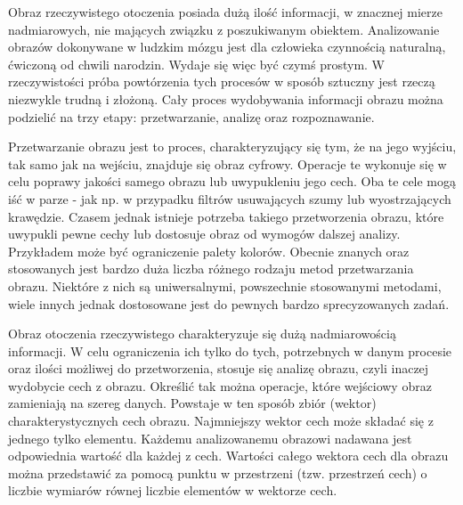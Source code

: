 
Obraz rzeczywistego otoczenia posiada dużą ilość informacji, w znacznej mierze nadmiarowych, nie mających związku z poszukiwanym obiektem. Analizowanie obrazów dokonywane w ludzkim mózgu jest dla człowieka czynnością naturalną, ćwiczoną od chwili narodzin. Wydaje się więc być czymś prostym. W rzeczywistości próba powtórzenia tych procesów w sposób sztuczny jest rzeczą niezwykle trudną i złożoną. Cały proces wydobywania informacji obrazu można podzielić na trzy etapy: przetwarzanie, analizę oraz rozpoznawanie.

Przetwarzanie obrazu jest to proces, charakteryzujący się tym, że na jego wyjściu, tak samo jak na wejściu, znajduje się obraz cyfrowy. Operacje te wykonuje się w celu poprawy jakości samego obrazu lub uwypukleniu jego cech. Oba te cele mogą iść w parze - jak np. w przypadku filtrów usuwających szumy lub wyostrzających krawędzie. Czasem jednak istnieje potrzeba takiego przetworzenia obrazu, które uwypukli pewne cechy lub dostosuje obraz od wymogów dalszej analizy. Przykładem może być ograniczenie palety kolorów. Obecnie znanych oraz stosowanych jest bardzo duża liczba różnego rodzaju metod przetwarzania obrazu. Niektóre z nich są uniwersalnymi, powszechnie stosowanymi metodami, wiele innych jednak dostosowane jest do pewnych bardzo sprecyzowanych zadań.

Obraz otoczenia rzeczywistego charakteryzuje się dużą nadmiarowością informacji. W celu ograniczenia ich tylko do tych, potrzebnych w danym procesie oraz ilości możliwej do przetworzenia, stosuje się analizę obrazu, czyli inaczej wydobycie cech z obrazu. Określić tak można operacje, które wejściowy obraz zamieniają na szereg danych. Powstaje w ten sposób zbiór (wektor) charakterystycznych cech obrazu. Najmniejszy wektor cech może składać się z jednego tylko elementu. Każdemu analizowanemu obrazowi nadawana jest odpowiednia wartość dla każdej z cech. Wartości całego wektora cech dla obrazu można przedstawić za pomocą punktu w przestrzeni (tzw. przestrzeń cech) o liczbie wymiarów równej liczbie elementów w wektorze cech.

